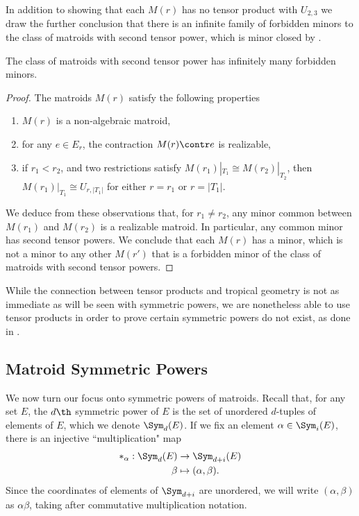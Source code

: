     In addition to showing that each $M(r)$ has no tensor product with $U_{2,3}$ we draw the further conclusion that there is an infinite family of forbidden minors to the class of matroids with second tensor power, which is minor closed by .
    \begin{corollary}\label{cor:tensorForbiddenMinors}
        The class of matroids with second tensor power has infinitely many forbidden minors.
    \end{corollary}
    \begin{proof}
    The matroids $M(r)$ satisfy the following properties \cite{Lind88}
    \begin{enumerate}
        \item $M(r)$ is a non-algebraic matroid,
        \item for any $e\in E_r$, the contraction $M(r) \contr e$ is realizable,
        \item if $r_1< r_2$, and two restrictions satisfy $M(r_1)|_{T_1}\cong M(r_2)|_{T_2}$, then $M(r_1)|_{T_1}\cong U_{r,|T_1|}$ for either $r= r_1$ or $r=|T_1|$.
    \end{enumerate}
    We deduce from these observations that, for $r_1\neq r_2$, any minor common between $M(r_1)$ and $M(r_2)$ is a realizable matroid. In particular, any common minor has second tensor powers. We conclude that each $M(r)$ has a minor, which is not a minor to any other $M(r')$ that is a forbidden minor of the class of matroids with second tensor powers.
    \end{proof}

    While the connection between tensor products and tropical geometry is not as immediate as will be seen with symmetric powers, we are nonetheless able to use tensor products in order to prove certain symmetric powers do not exist, as done in \cite{DR19}.

\subsection{Matroid Symmetric Powers}
We now turn our focus onto symmetric powers of matroids. Recall that, for any set $E$, the $d\th$ symmetric power of $E$ is the set of unordered $d$-tuples of elements of $E$, which we denote $\Sym_d(E)$. If we fix an element $\alpha \in \Sym_i(E)$, there is an injective ``multiplication" map
    \begin{align*}
        *_\alpha: \Sym_d(E)&\to \Sym_{d+i}(E)\\
        \beta&\mapsto (\alpha,\beta).
    \end{align*}
Since the coordinates of elements of $\Sym_{d+i}$ are unordered, we will write $(\alpha,\beta)$ as $\alpha\beta$, taking after commutative multiplication notation. 

